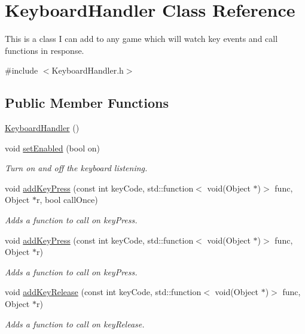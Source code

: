 \hypertarget{class_keyboard_handler}{\section{\-Keyboard\-Handler \-Class \-Reference}
\label{class_keyboard_handler}
}


\-This is a class \-I can add to any game which will watch key events and call functions in response.  




{\ttfamily \#include $<$\-Keyboard\-Handler.\-h$>$}

\subsection*{\-Public \-Member \-Functions}
\begin{DoxyCompactItemize}
\item 
\hyperlink{class_keyboard_handler_a3231b1f3ad96f40b7dccf4d095b79da4}{\-Keyboard\-Handler} ()
\item 
void \hyperlink{class_keyboard_handler_a6e2eb2b14a8ff7c320a3fac5ad8c5f33}{set\-Enabled} (bool on)
\begin{DoxyCompactList}\small\item\em \-Turn on and off the keyboard listening. \end{DoxyCompactList}\item 
void \hyperlink{class_keyboard_handler_a770d2ae9b0801e0ede1e407e1fda644b}{add\-Key\-Press} (const int key\-Code, std\-::function$<$ void(\-Object $\ast$)$>$ func, \-Object $\ast$r, bool call\-Once)
\begin{DoxyCompactList}\small\item\em \-Adds a function to call on key\-Press. \end{DoxyCompactList}\item 
void \hyperlink{class_keyboard_handler_a262ed855a0f0c11cc8c83aec352e0f50}{add\-Key\-Press} (const int key\-Code, std\-::function$<$ void(\-Object $\ast$)$>$ func, \-Object $\ast$r)
\begin{DoxyCompactList}\small\item\em \-Adds a function to call on key\-Press. \end{DoxyCompactList}\item 
void \hyperlink{class_keyboard_handler_a525e8ed1dbcf0a455f80183dcc29be7c}{add\-Key\-Release} (const int key\-Code, std\-::function$<$ void(\-Object $\ast$)$>$ func, \-Object $\ast$r)
\begin{DoxyCompactList}\small\item\em \-Adds a function to call on key\-Release. \end{DoxyCompactList}\item 

\end{DoxyCompactItemize}
